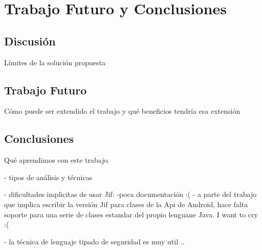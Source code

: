 \label{ch:trabajoFuturo}
\chapter{Trabajo Futuro y Conclusiones}
\section{Discusión}
Límites de la solución propuesta 

\section{Trabajo Futuro}
Cómo puede ser extendido el trabajo y qué beneficios tendría esa extensión 

\section{Conclusiones}
Qué aprendimos con este trabajo.\newline

- tipos de análisis y técnicas

- dificultades implicitas de usar Jif:\newline
-poca documentación :(
- a parte del trabajo que implica escribir la versión Jif para clases de la Api
de Android, hace falta soporte para una serie de clases estandar del propio
lenguane Java. I want to cry :(\newline

- la técnica de lenguaje tipado de seguridad es muy util ..



